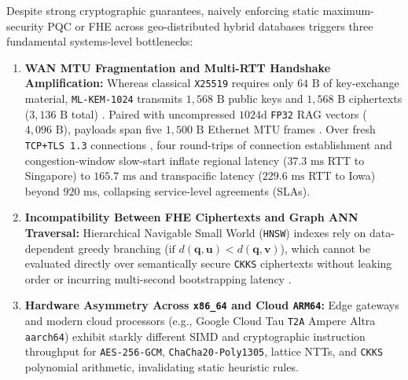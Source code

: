\documentclass[10pt,journal,compsoc]{IEEEtran}
\begin{document}
Despite strong cryptographic guarantees, naively enforcing static maximum-security PQC or FHE across geo-distributed hybrid databases triggers three fundamental systems-level bottlenecks:
\begin{enumerate}
    \item \textbf{WAN MTU Fragmentation and Multi-RTT Handshake Amplification:} Whereas classical \texttt{X25519} requires only $64\text{ B}$ of key-exchange material, \texttt{ML-KEM-1024} transmits $1{,}568\text{ B}$ public keys and $1{,}568\text{ B}$ ciphertexts ($3{,}136\text{ B}$ total) \cite{nist_fips203_2024,stebila2016liboqs}. Paired with uncompressed $1024\text{d}$ \texttt{FP32} RAG vectors ($4{,}096\text{ B}$), payloads span five $1{,}500\text{ B}$ Ethernet MTU frames \cite{paquin2020pqctls,sikeridis2020pqctls_wan,sosnowski2023pqc_quic}. Over fresh \texttt{TCP+TLS~1.3} connections \cite{rescorla2018rfc8446}, four round-trips of connection establishment and congestion-window slow-start inflate regional latency ($37.3\text{ ms}$ RTT to Singapore) to $165.7\text{ ms}$ and transpacific latency ($229.6\text{ ms}$ RTT to Iowa) beyond $920\text{ ms}$, collapsing service-level agreements (SLAs).
    \item \textbf{Incompatibility Between FHE Ciphertexts and Graph ANN Traversal:} Hierarchical Navigable Small World (\texttt{HNSW}) indexes \cite{malkov2020hnsw,pgvector2024} rely on data-dependent greedy branching ($\text{if } d(\mathbf{q},\mathbf{u}) < d(\mathbf{q},\mathbf{v})$), which cannot be evaluated directly over semantically secure \texttt{CKKS} ciphertexts without leaking order or incurring multi-second bootstrapping latency \cite{albadawi2022openfhe,engelsma2022hers}.
    \item \textbf{Hardware Asymmetry Across \texttt{x86\_64} and Cloud \texttt{ARM64}:} Edge gateways and modern cloud processors (e.g., Google Cloud Tau \texttt{T2A} Ampere Altra \texttt{aarch64}) exhibit starkly different SIMD and cryptographic instruction throughput for \texttt{AES-256-GCM}, \texttt{ChaCha20-\allowbreak Poly1305}, lattice NTTs, and \texttt{CKKS} polynomial arithmetic, invalidating static heuristic rules.
\end{enumerate}
\end{document}
